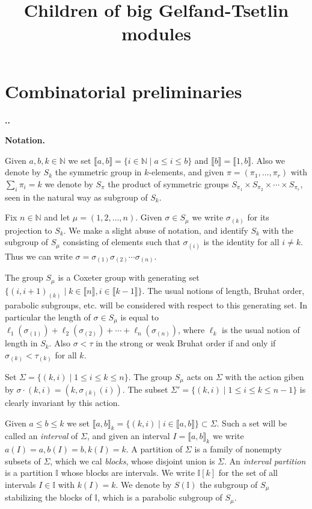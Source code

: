 \documentclass[11pt,fleqn]{amsart}
\title{Children of big Gelfand-Tsetlin modules}
\date{}
\renewcommand\thesection{\arabic{section}}
\newcounter{para}[section]
\renewcommand\thepara{\thesection.\arabic{para}}
\def\paragraph{%
 \noindent
 \refstepcounter{para}%
 \textbf{\thepara.}\hspace{1ex}%
}
\newcommand\about[1]{%
 {\bfseries#1.}%
}
\newcommand\NN{\mathbb N}
\newcommand\II{\mathbb I}
\newcommand\interval[1]{\llbracket #1 \rrbracket}
\begin{document}
\maketitle
\section{Combinatorial preliminaries}

\paragraph
\about{Notation}
\label{notation}
Given $a,b,k \in \NN$ we set $\interval{a,b} = \{i \in \NN \mid a \leq i \leq 
b\}$ and $\interval{b} = \interval{1,b}$. Also we denote by $S_k$ the 
symmetric group in $k$-elements, and given $\pi = (\pi_1, \ldots, \pi_r)$
with $\sum_i \pi_i = k$ we denote by $S_\pi$ the product of symmetric groups
$S_{\pi_1} \times S_{\pi_2} \times \cdots \times S_{\pi_r}$, seen in the 
natural way as subgroup of $S_k$.

Fix $n \in \NN$ and let $\mu = (1, 2, \ldots, n)$. Given $\sigma \in S_\mu$ we 
write $\sigma_{(k)}$ for its projection to $S_k$. We make a slight abuse of 
notation, and identify $S_k$ with the subgroup of $S_\mu$ consisting of 
elements such that $\sigma_(i)$ is the identity for all $i \neq k$. Thus we 
can write $\sigma = \sigma_{(1)} \sigma_{(2)} \cdots \sigma_{(n)}$.

The group $S_\mu$ is a Coxeter group with generating set $\{(i,i+1)_{(k)}
\mid k \in \interval{n}, i \in \interval{k-1}\}$. The usual notions of length,
Bruhat order, parabolic subgroups, etc. will be considered with respect to 
this generating set. In particular the length of $\sigma \in 
S_\mu$ is equal to $\ell_1(\sigma_{(1)}) + \ell_2(\sigma_{(2)}) + \cdots + 
\ell_n(\sigma_{(n)})$, where $\ell_k$ is the usual notion of length in $S_k$.
Also $\sigma < \tau$ in the strong or weak Bruhat order if and only if 
$\sigma_{(k)} < \tau_{(k)}$ for all $k$.

Set $\Sigma = \{(k,i) \mid 1 \leq i \leq k \leq n\}$. The group $S_\mu$ acts 
on $\Sigma$ with the action giben by $\sigma \cdot (k,i) = (k, 
\sigma_{(k)}(i))$. The subset $\Sigma' = \{(k,i) \mid 1 \leq i \leq k \leq n-1
\}$ is clearly invariant by this action. 

Given $a \leq b \leq k$ we set $\interval{a,b}_k = \{(k,i) \mid i \in 
\interval{a,b}\} \subset \Sigma$. Such a set will be called an \emph{interval}
of $\Sigma$, and given an interval $I = \interval{a,b}_k$ we write $a(I) = a,
b(I) = b, k(I) = k$. A partition of $\Sigma$ is a family of nonempty subsets 
of $\Sigma$, which we cal \emph{blocks}, whose disjoint union is $\Sigma$.
An \emph{interval partition} is a partition $\II$ whose blocks are intervals. 
We write $\II[k]$ for the set of all intervals $I \in \II$ with $k(I) = k$. 
We denote by $S(\II)$ the subgroup of $S_\mu$ stabilizing the blocks of $\II$,
which is a parabolic subgroup of $S_\mu$.
\end{document}
